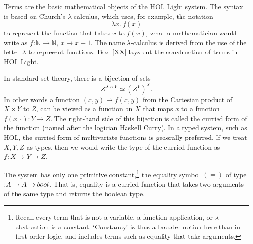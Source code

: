\documentclass{llncs}
\def\tc{\hbox{:}}
\newcommand{\ring}[1]{\mathbb{#1}}
\begin{document}
Terms are the basic mathematical objects of the HOL Light system.  The syntax is based
on Church's $\lambda$-calculus, which uses, for example, the notation
   $$
   \lambda x.\ f (x)
   $$
to represent the function that takes $x$ to $f(x)$, what a mathematician would write
as $f:\ring{N}\to\ring{N}$, $x\mapsto x+1$.  The name $\lambda$-calculus is derived
from the use of the letter $\lambda$ to represent functions.  Box~\ref{XX} lays out
the construction of terms in HOL Light.



In standard set theory, there is a bijection of sets
  $$
  Z^{X \times Y} \simeq (Z^Y)^X.
  $$
In other words a function $(x,y)\mapsto f(x,y)$
from the Cartesian product of $X \times Y$ to $Z$, can be viewed as a function on
$X$ that maps $x$ to a function $f(x,\cdot):Y\to Z$.  The right-hand side of this
bijection is called the curried form of the function (named after the logician Haskell Curry).  
In a typed system, such
as HOL, the curried form of multivariate functions is generally preferred.  If we
treat $X,Y,Z$ as types, then we would write the type of the curried function as
$f:X\to Y \to Z$.

The system has only one primitive constant,\footnote{Recall every term that is
not a variable, a function application, or $\lambda$-abstraction is a constant.  `Constancy' is thus a broader notion here than in first-order logic, and includes terms
such as equality that take arguments.}  
the equality symbol $( = )$
of type $\tc A\to A\to  bool$.  
That is, equality is a curried function that takes two arguments of the same type
and returns the boolean type.
\end{document}
